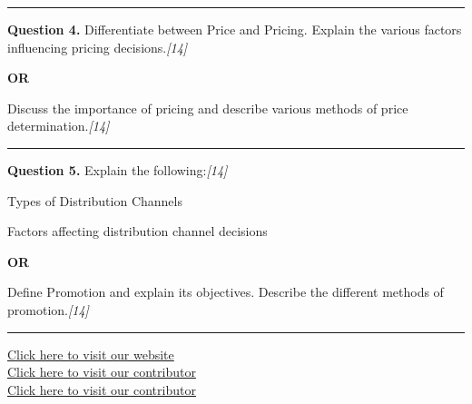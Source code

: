 \documentclass[11pt,a4paper]{article}
\newcommand{\pts}[1]{\hfill   \textit{[#1]}}
\begin{document}
\medskip\rule{\linewidth}{0.2pt}




\noindent   \textbf{Question 4.}
Differentiate between Price and Pricing. Explain the various factors influencing pricing decisions.\pts{14}

\centerline{   \textbf{OR}}

Discuss the importance of pricing and describe various methods of price determination.\pts{14}

\medskip\rule{\linewidth}{0.2pt}




\noindent   \textbf{Question 5.}
Explain the following:\pts{14}

\begin{parts}
  \item Types of Distribution Channels
  \item Factors affecting distribution channel decisions
\end{parts}

\centerline{   \textbf{OR}}

Define Promotion and explain its objectives. Describe the different methods of promotion.\pts{14}

\vfill
\rule{\linewidth}{0.4pt}

\begin{center}\small
\href{https://bhu-exam.vercel.app/}{Click here to visit our website}\\[4pt]
\href{https://me-aryan.vercel.app/}{Click here to visit our contributor}\\[4pt]
\href{https://quashan-me.vercel.app/}{Click here to visit our contributor}
\end{center}
\end{document}
